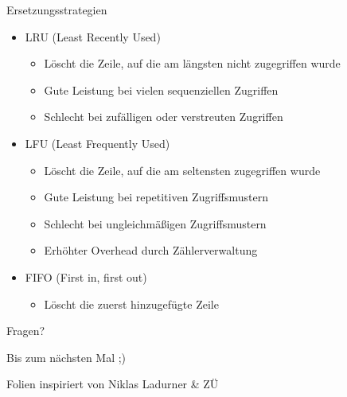 \documentclass[
  german,            %
  aspectratio=169,    %
]{tumbeamer}
\begin{document}
\begin{frame}[c]{Ersetzungsstrategien}
  \begin{itemize}
      \item LRU (Least Recently Used)
      \begin{itemize}
        \item Löscht die Zeile, auf die am längsten nicht zugegriffen wurde
        \item Gute Leistung bei vielen sequenziellen Zugriffen
        \item Schlecht bei zufälligen oder verstreuten Zugriffen
      \end{itemize}
      \item LFU (Least Frequently Used)
      \begin{itemize}
        \item Löscht die Zeile, auf die am seltensten zugegriffen wurde
        \item Gute Leistung bei repetitiven Zugriffsmustern
        \item Schlecht bei ungleichmäßigen Zugriffsmustern
        \item Erhöhter Overhead durch Zählerverwaltung
      \end{itemize}
      \item FIFO (First in, first out)
      \begin{itemize}
        \item Löscht die zuerst hinzugefügte Zeile
      \end{itemize}
  \end{itemize}
\end{frame}

\begin{frame}[c]{}{}
  \begin{center}
    \LARGE Fragen?
  \end{center}
  \vspace{0.5cm}
  \begin{center}
    \LARGE Bis zum nächsten Mal ;) \\
  \end{center}
  \vspace{1.0cm}
  \begin{center}
    \small Folien inspiriert von Niklas Ladurner \& ZÜ
  \end{center}
\end{frame}
\end{document}
